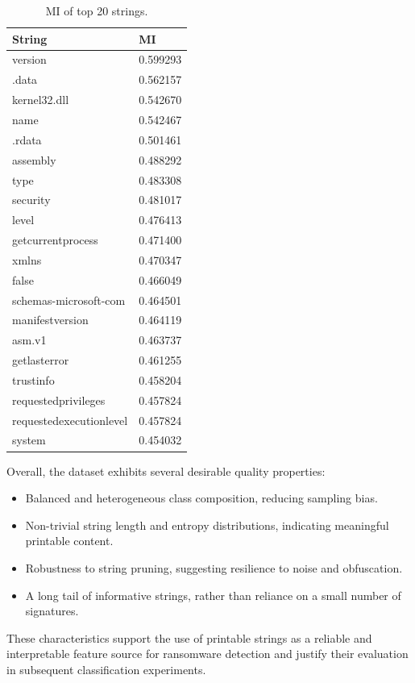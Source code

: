 \documentclass[conference]{IEEEtran}
\begin{document}
\begin{table}[H]
\begin{center}
    \caption{\label{tab:mi} MI of top 20 strings.}
    \begin{tabular}{|l|l|}
     \hline
    \textbf{String}         & \textbf{MI}   \\ \hline
    version                 & 0.599293      \\ \hline
    .data                   & 0.562157      \\ \hline
    kernel32.dll            & 0.542670      \\ \hline
    name                    & 0.542467      \\ \hline
    .rdata                  & 0.501461      \\ \hline
    assembly                & 0.488292      \\ \hline
    type                    & 0.483308      \\ \hline
    security                & 0.481017      \\ \hline
    level                   & 0.476413      \\ \hline
    getcurrentprocess       & 0.471400      \\ \hline
    xmlns                   & 0.470347      \\ \hline
    false                   & 0.466049      \\ \hline
    schemas-microsoft-com   & 0.464501      \\ \hline
    manifestversion         & 0.464119      \\ \hline
    asm.v1                  & 0.463737      \\ \hline
    getlasterror            & 0.461255      \\ \hline
    trustinfo               & 0.458204      \\ \hline
    requestedprivileges     & 0.457824      \\ \hline
    requestedexecutionlevel & 0.457824      \\ \hline
    system                  & 0.454032      \\ \hline
    \end{tabular}
\end{center}
\end{table}
Overall, the dataset exhibits several desirable quality properties:
\begin{itemize}
    \item Balanced and heterogeneous class composition, reducing sampling bias.
    \item Non-trivial string length and entropy distributions, indicating meaningful printable content.
    \item Robustness to string pruning, suggesting resilience to noise and obfuscation.
    \item A long tail of informative strings, rather than reliance on a small number of signatures.
\end{itemize}
These characteristics support the use of printable strings as a reliable and interpretable feature source for ransomware detection and justify their evaluation in subsequent classification experiments.
\end{document}
